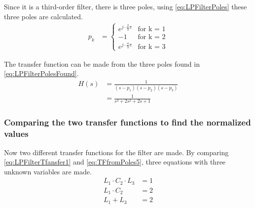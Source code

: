 Since it is a third-order filter, there is three poles, using \autoref{eq:LPFilterPoles} these three poles are calculated. 
\begin{align} \label{eq:LPFilterPolesFound}
 p_{k} &=
  \begin{cases}
   e^{j \cdot \frac{2}{3}\pi}   & \text{for k = 1} \\
   -1							& \text{for k = 2} \\
   e^{j \cdot \frac{4}{3}\pi}   & \text{for k = 3}
  \end{cases}
\end{align}

The transfer function can be made from the three poles found in \autoref{eq:LPFilterPolesFound}.
\begin{subequations}
\begin{align}  
H(s) &= \frac{1}{(s-p_{1})(s-p_{2})(s-p_{3})} \label{eq:TFfromPoles1} \\
 &= \frac{1}{s^{3} + 2s^{2}+2s+1} \label{eq:TFfromPoles5} 
\end{align}
\end{subequations}

\subsubsection{Comparing the two transfer functions to find the normalized values}
Now two different transfer functions for the filter are made. 
By comparing \autoref{eq:LPFilterTfansfer1} and \autoref{eq:TFfromPoles5}, three equations with three unknown variables are made.
\begin{subequations}
\begin{align}
L_1 \cdot C_2 \cdot L_3 &= 1  \label{eq:LPFilter3equations1} \\
L_1 \cdot C_2 &= 2 \label{eq:LPFilter3equations2} \\
L_1 + L_3 &= 2 \label{eq:LPFilter3equations3}
\end{align}
\end{subequations} 

